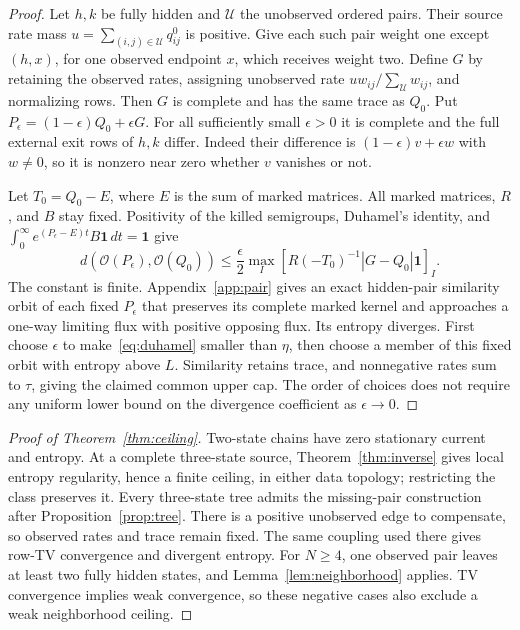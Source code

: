 \documentclass[aps,pre,onecolumn,11pt,longbibliography,notitlepage]{revtex4-2}
\newcommand{\1}{\mathbf 1}
\newcommand{\Obs}{\mathcal O}
\begin{document}
\begin{proof}
Let $h,k$ be fully hidden and $\mathcal U$ the unobserved ordered pairs. Their source rate mass $u=\sum_{(i,j)\in\mathcal U}q^0_{ij}$ is positive. Give each such pair weight one except $(h,x)$, for one observed endpoint $x$, which receives weight two. Define $G$ by retaining the observed rates, assigning unobserved rate $u w_{ij}/\sum_{\mathcal U}w_{ij}$, and normalizing rows. Then $G$ is complete and has the same trace as $Q_0$. Put $P_\epsilon=(1-\epsilon)Q_0+\epsilon G$. For all sufficiently small $\epsilon>0$ it is complete and the full external exit rows of $h,k$ differ. Indeed their difference is $(1-\epsilon)v+\epsilon w$ with $w\ne0$, so it is nonzero near zero whether $v$ vanishes or not.

Let $T_0=Q_0-E$, where $E$ is the sum of marked matrices. All marked matrices, $R$, and $B$ stay fixed. Positivity of the killed semigroups, Duhamel's identity, and $\int_0^\infty e^{(P_\epsilon-E)t}B\1\,dt=\1$ give
\begin{equation}
 d(\Obs(P_\epsilon),\Obs(Q_0))
 \le\frac\epsilon2\max_I[R(-T_0)^{-1}|G-Q_0|\1]_I.\label{eq:duhamel}
\end{equation}
The constant is finite. Appendix~\ref{app:pair} gives an exact hidden-pair similarity orbit of each fixed $P_\epsilon$ that preserves its complete marked kernel and approaches a one-way limiting flux with positive opposing flux. Its entropy diverges. First choose $\epsilon$ to make~\eqref{eq:duhamel} smaller than $\eta$, then choose a member of this fixed orbit with entropy above $L$. Similarity retains trace, and nonnegative rates sum to $\tau$, giving the claimed common upper cap. The order of choices does not require any uniform lower bound on the divergence coefficient as $\epsilon\to0$.
\end{proof}

\begin{proof}[Proof of Theorem~\ref{thm:ceiling}]
Two-state chains have zero stationary current and entropy. At a complete three-state source, Theorem~\ref{thm:inverse} gives local entropy regularity, hence a finite ceiling, in either data topology; restricting the class preserves it. Every three-state tree admits the missing-pair construction after Proposition~\ref{prop:tree}. There is a positive unobserved edge to compensate, so observed rates and trace remain fixed. The same coupling used there gives row-TV convergence and divergent entropy. For $N\ge4$, one observed pair leaves at least two fully hidden states, and Lemma~\ref{lem:neighborhood} applies. TV convergence implies weak convergence, so these negative cases also exclude a weak neighborhood ceiling.
\end{proof}
\end{document}
